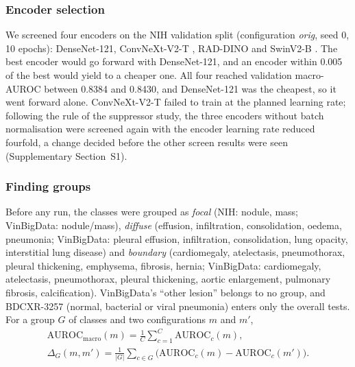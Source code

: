 \subsubsection{Encoder selection}
We screened four encoders on the NIH validation split (configuration \emph{orig}, seed 0, 10 epochs): DenseNet-121, ConvNeXt-V2-T
\cite{woo2023convnextv2}, RAD-DINO \cite{perezgarcia2025raddino} and SwinV2-B \cite{liu2022swinv2}. The best encoder would go forward with
DenseNet-121, and an encoder within 0.005 of the best would yield to a cheaper one. All four reached validation macro-AUROC between 0.8384
and 0.8430, and DenseNet-121 was the cheapest, so it went forward alone. ConvNeXt-V2-T failed to train at the planned learning rate;
following the rule of the suppressor study, the three encoders without batch normalisation were screened again with the encoder learning
rate reduced fourfold, a change decided before the other screen results were seen (Supplementary Section~S1).

\subsubsection{Finding groups}
Before any run, the classes were grouped as \emph{focal} (NIH: nodule, mass; VinBigData: nodule/mass), \emph{diffuse} (effusion,
infiltration, consolidation, oedema, pneumonia; VinBigData: pleural effusion, infiltration, consolidation, lung opacity, interstitial lung
disease) and \emph{boundary} (cardiomegaly, atelectasis, pneumothorax, pleural thickening, emphysema, fibrosis, hernia; VinBigData:
cardiomegaly, atelectasis, pneumothorax, pleural thickening, aortic enlargement, pulmonary fibrosis, calcification). VinBigData's ``other
lesion'' belongs to no group, and BDCXR-3257 (normal, bacterial or viral pneumonia) enters only the overall tests. For a group $G$ of classes
and two configurations $m$ and $m'$,
\begin{equation}
\begin{gathered}
\mathrm{AUROC}_{\mathrm{macro}}(m)=\frac1C\sum_{c=1}^{C}\mathrm{AUROC}_c(m),\\
\Delta_G(m,m')=\frac{1}{|G|}\sum_{c\in G}\big(\mathrm{AUROC}_c(m)-\mathrm{AUROC}_c(m')\big).
\end{gathered}
\label{eq:group}
\end{equation}

